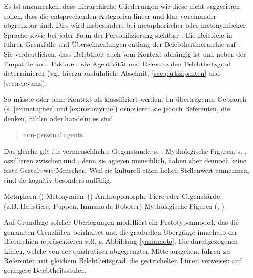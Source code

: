 Es ist anzumerken, dass hierarchische Gliederungen wie diese nicht suggerieren sollen, dass die entsprechenden Kategorien linear und klar voneinander abgrenzbar sind. Dies wird  insbesondere bei metaphorischer oder metonymischer Sprache sowie bei jeder Form der Personifizierung sichtbar \parencite[vgl.][62]{Dahl1996}. Die Beispiele in  führen Grenzfälle und Überschneidungen entlang der Belebtheithierarchie auf \parencites()()[basierend auf][62f.]{Dahl1996}[18ff]{Yamamoto1999}. Sie verdeutlichen, dass Belebtheit auch vom Kontext abhängig ist und neben der Empathie auch Faktoren wie Agentivität und Relevanz den Belebtheitsgrad determinieren (vgl. hierzu ausführlich: Abschnitt \ref{sec:partizipanten} und \ref{sec:relevanz}).

So müsste  oder  ohne Kontext als  klassifiziert werden. Im übertragenen Gebrauch (s. \ref{ex:metapher} und \ref{ex:metonymie}) denotieren sie jedoch Referenten, die denken, fühlen oder handeln; es sind \blockcquote[62]{Dahl1996}{non-personal agents}. Das gleiche gilt für vermenschlichte Gegenstände, s.  \parencite[vgl. auch][]{Epley2007}. Mythologische Figuren, s. , oszillieren zwischen  und , denn sie agieren menschlich, haben aber dennoch keine feste Gestalt wie Menschen. Weil sie kulturell einen hohen Stellenwert einnehmen, sind sie kognitiv besonders auffällig. 
  
\begin{exe}
	\ex \label{ex:borderlines}
	\begin{xlist}
		\ex \label{ex:metapher} Metaphern ()
 		\ex \label{ex:metonymie} Metonymien: ()
		\ex \label{ex:anthropo} Anthropomorphe Tiere oder Gegenstände \\(z.B. Haustiere, Puppen, humanoide Roboter)	
		\ex \label{ex:mytho} Mythologische Figuren (, )
	\end{xlist}
\end{exe}
\noindent
Auf Grundlage solcher Überlegungen modelliert \textcite{Yamamoto1999} ein Prototypenmodell, das die genannten Grenzfällen beinhaltet und die graduellen Übergänge innerhalb der Hierarchien repräsentieren soll, s. Abbildung \ref{yamamoto}. Die durchgezogenen Linien, welche von der quadratisch-abgegrenzten Mitte ausgehen, führen zu Referenten mit gleichem Belebtheitsgrad; die gestrichelten Linien verweisen auf geringere Belebtheitsstufen.

